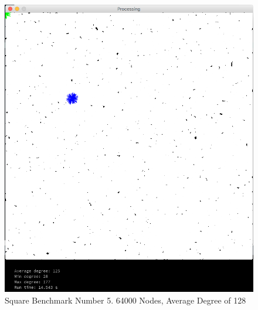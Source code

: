 \documentclass{article}
\begin{document}
\begin{figure}
    \centering
    \includegraphics[scale=0.45]{./images/square_4.png}
    \caption{Square Benchmark Number 5. 64000 Nodes, Average Degree of 128}
    \label{square4}
\end{figure}
\end{document}
